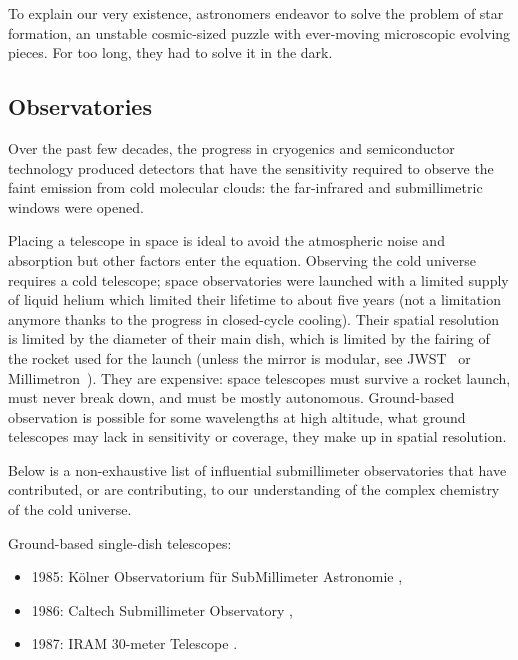To explain our very existence, astronomers endeavor to solve the problem of star formation,
an unstable cosmic-sized puzzle with ever-moving microscopic evolving pieces.
For too long, they had to solve it in the dark.

\subsection{Observatories}

Over the past few decades, the progress in cryogenics and semiconductor technology produced detectors that have the sensitivity required to observe the faint emission from cold molecular clouds: the far-infrared and submillimetric windows were opened.

Placing a telescope in space is ideal to avoid the atmospheric noise and absorption but other factors enter the equation.
Observing the cold universe requires a cold telescope; space observatories were launched with a limited supply of liquid helium which limited their lifetime to about five years (not a limitation anymore thanks to the progress in closed-cycle cooling).
Their spatial resolution is limited by the diameter of their main dish, which is limited by the fairing of the rocket used for the launch (unless the mirror is modular, see JWST~\autocite{lightsey2012james} or Millimetron~\autocite{wild2009millimetron}).
They are expensive: space telescopes must survive a rocket launch, must never break down, and must be mostly autonomous.
Ground-based observation is possible for some wavelengths at high altitude,
what ground telescopes may lack in sensitivity or coverage, they make up in spatial resolution.

Below is a non-exhaustive list of influential submillimeter observatories that have contributed, or are contributing, to our understanding of the complex chemistry of the cold universe.

\noindent\begin{minipage}{\linewidth}
Ground-based single-dish telescopes:
\begin{itemize}[noitemsep,nolistsep]
    \item 1985: Kölner Observatorium für SubMillimeter Astronomie \autocite{kramer1998new},
    \item 1986: Caltech Submillimeter Observatory   \autocite{murdin2000caltech},
    \item 1987: IRAM 30-meter Telescope             \autocite{baars1987iram}.
\end{itemize}
\end{minipage}

